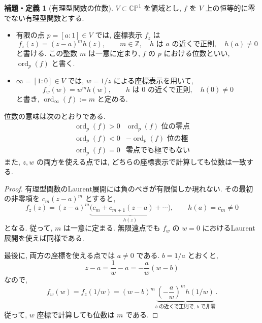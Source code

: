 \documentclass[dvipdfmx,a4paper,11pt]{article} %
\newcommand{\Z}{\mathbb{Z}}
\newcommand{\C}{\mathbb{C}}
\theoremstyle{definition}
\numberwithin{equation}{section}
\newtheorem{lemdfn}[thm]{補題・定義}
\begin{document}
\begin{lemdfn}[有理型関数の位数]\label{O-M019}
$V\subset\C\mathbb P^1$ を領域とし,
$f$ を $V$ 上の恒等的に零でない有理型関数とする.

\begin{itemize}
\item 有限の点 $p=[a:1]\in V$ では, 座標表示 $f_z$ は
\[
f_z(z)=(z-a)^m h(z),
\qquad m\in\Z,\quad h\text{ は }a\text{ の近くで正則},\quad h(a)\neq0
\]
と書ける.
この整数 $m$ は一意に定まり,
$f$ の $p$ における位数といい,
$\operatorname{ord}_p(f)$ と書く.
\item $\infty=[1:0]\in V$ では, $w=1/z$ による座標表示を用いて,
\[
f_w(w)=w^m h(w),
\qquad h\text{ は }0\text{ の近くで正則},\quad h(0)\neq0
\]
と書き, $\operatorname{ord}_\infty(f):=m$ と定める.
\end{itemize}

位数の意味は次のとおりである.
\[
\begin{array}{c|c}
\operatorname{ord}_p(f)>0 & \operatorname{ord}_p(f)\text{ 位の零点}\\
\operatorname{ord}_p(f)<0 & -\operatorname{ord}_p(f)\text{ 位の極}\\
\operatorname{ord}_p(f)=0 & \text{零点でも極でもない}
\end{array}
\]
また, $z,w$ の両方を使える点では,
どちらの座標表示で計算しても位数は一致する.
\end{lemdfn}

\begin{proof}
有理型関数のLaurent展開には負のべきが有限個しか現れない.
その最初の非零項を $c_m(z-a)^m$ とすると,
\[
f_z(z)=(z-a)^m
\underbrace{\bigl(c_m+c_{m+1}(z-a)+\cdots\bigr)}_{h(z)},
\qquad h(a)=c_m\neq0
\]
となる.
従って, $m$ は一意に定まる.
無限遠点でも $f_w$ の $w=0$ におけるLaurent展開を使えば同様である.

最後に, 両方の座標を使える点では $a\neq0$ である.
$b=1/a$ とおくと,
\[
z-a=\frac1w-a=-\frac aw(w-b)
\]
なので,
\[
f_w(w)=f_z(1/w)
=(w-b)^m
\underbrace{\left(-\frac aw\right)^m h(1/w)}_{b\text{ の近くで正則で, }b\text{ で非零}}.
\]
従って, $w$ 座標で計算しても位数は $m$ である.
\end{proof}
\end{document}
